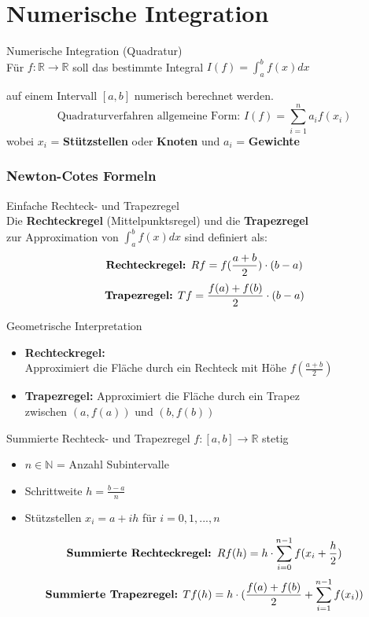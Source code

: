 \section{Numerische Integration}

\begin{definition}{Numerische Integration (Quadratur)}\\
Für  $f: \mathbb{R} \rightarrow \mathbb{R}$ soll das bestimmte Integral
$I(f) = \int_a^b f(x) dx$

auf einem Intervall $[a,b]$ numerisch berechnet werden.
\vspace{-2mm}\\
$$\text{Quadraturverfahren allgemeine Form: }I(f) = \sum_{i=1}^{n} a_i f(x_i)$$
\vspace{-2mm}
wobei $x_i$ = \textbf{Stützstellen} oder \textbf{Knoten} und $a_i$ = \textbf{Gewichte}
\end{definition}

\subsubsection{Newton-Cotes Formeln}

\begin{definition}{Einfache Rechteck- und Trapezregel}\\
Die \textbf{Rechteckregel} (Mittelpunktsregel) und die \textbf{Trapezregel} \\ zur Approximation von $\int_a^b f(x) dx$ sind definiert als:
$$\text{\textbf{Rechteckregel:} } Rf = f(\frac{a+b}{2}) \cdot (b-a)$$
$$\text{\textbf{Trapezregel:} } Tf = \frac{f(a) + f(b)}{2} \cdot (b-a)$$
\end{definition}

\begin{concept}{Geometrische Interpretation}
\begin{itemize}
    \item \textbf{Rechteckregel:} \\Approximiert die Fläche durch ein Rechteck mit Höhe $f(\frac{a+b}{2})$
    \item \textbf{Trapezregel:} Approximiert die Fläche durch ein Trapez \\ zwischen $(a,f(a))$ und $(b,f(b))$
\end{itemize}
\end{concept}

\begin{theorem}{Summierte Rechteck- und Trapezregel} $f: [a,b] \rightarrow \mathbb{R}$ stetig
\begin{itemize}
    \item $n \in \mathbb{N}$ = Anzahl Subintervalle
    \item Schrittweite $h = \frac{b-a}{n}$
    \item Stützstellen $x_i = a + ih$ für $i = 0, 1, ..., n$
\end{itemize}
$$\text{\textbf{Summierte Rechteckregel: }} Rf(h) = h \cdot \sum_{i=0}^{n-1} f(x_i + \frac{h}{2})$$
$$\text{\textbf{Summierte Trapezregel:} } Tf(h) = h \cdot (\frac{f(a) + f(b)}{2} + \sum_{i=1}^{n-1} f(x_i))$$
\end{theorem}

